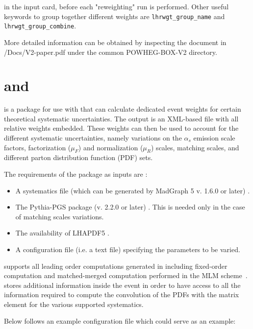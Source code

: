 in the input card, before each "reweighting" run is performed. Other 
useful keywords to group together different weights are 
\texttt{lhrwgt\_group\_name} and \texttt{lhrwgt\_group\_combine}. 

More detailed information can be obtained by inspecting the document in 
{\namecaps /Docs/V2-paper.pdf} under the common {\namecaps POWHEG-BOX-V2} directory. 

\section{\madgraph and \syscalc}


\syscalc is a package for use with \madgraph that can calculate dedicated event weights for certain theoretical systematic uncertainties. The output is an XML-based file with all relative weights embedded. These weights can then be used to account for the different systematic uncertainties, namely variations on the $\alpha_s$ emission scale factors, factorization ($\mu_F$) and normalization ($\mu_R$) scales,  matching scales, and different parton distribution function (PDF) sets.

The requirements of the package as inputs are : 
\begin{itemize}
\item A systematics file (which can be generated by MadGraph 5 v. 1.6.0 or later) \cite{Alwall:1405.0301,Alwall:2011uj}.
\item The Pythia-PGS package (v. 2.2.0 or later) \cite{Sjostrand:2006za}. This is needed only in the case of matching scales variations.
\item The availability of LHAPDF5 \cite{Whalley:2005nh}.
\item A configuration file (i.e. a text file) specifying the parameters to be varied. 
\end{itemize}

\syscalc supports all leading order computations generated in \madgraph including fixed-order computation and matched-merged computation performed in the MLM scheme~\cite{Mangano:2006rw}.
\madgraph stores additional information inside the event in order to have access to all the information required to compute the convolution of the PDFs with the matrix element for the various supported systematics.

Below follows an example configuration file which could serve as an example:\\[2mm]

